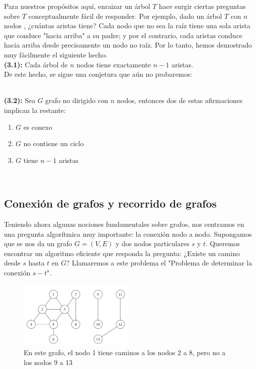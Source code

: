 \documentclass[a4paper]{article}
\begin{document}
Para nuestros propósitos aquí, enraizar un árbol $T$  hace surgir ciertas preguntas sobre $T$ conceptualmente fácil de responder. Por ejemplo, dado un árbol $T$ con $n$ nodos , ¿cuántas aristas tiene? Cada nodo que no sea la raíz tiene una sola arista que conduce "hacia arriba" a su padre; y por el contrario, cada aristas conduce hacia arriba desde precisamente un nodo no raíz. Por lo tanto, hemos demostrado muy fácilmente el siguiente hecho. \\

\textbf{(3.1):} Cada árbol de $n$ nodos tiene exactamente $n- 1$ aristas. \\

De este hecho, se sigue una conjetura que aún no probaremos:\\
\\
 \colorbox{mygray}{\parbox{15cm}{
	\textbf{(3.2):} Sea $G$ grafo no dirigido con $n$ nodos, entonces dos de estas afirmaciones implican la restante:
    \begin{enumerate}
    \item $G$ es conexo
    \item $G$ no contiene un ciclo 
    \item $G$ tiene $n-1$ aristas
    \end{enumerate}

  }}\\

	\subsection{Conexión de grafos y recorrido de grafos}
    Teniendo ahora algunas nociones fundamentales sobre grafos, nos centramos en una pregunta algorítmica muy importante: la conexión nodo a nodo. Supongamos que se nos da un grafo $G = (V,E)$ y dos nodos particulares $s$ y $t$. Queremos encontrar un algoritmo eficiente que responda la pregunta: ¿Existe un camino desde $s$ hasta $t$ en $G$? Llamaremos a este problema el "Problema de determinar la conexión $s-t$".\\

\begin{figure}[h]
\centering
\includegraphics[width=0.5\textwidth]{Imagenes-Seccion3/fig32.png}
\caption{En este grafo, el nodo 1 tiene caminos a los nodos 2 a 8, pero no a los nodos 9 a 13}
\label{fig32}
\end{figure}
\end{document}
